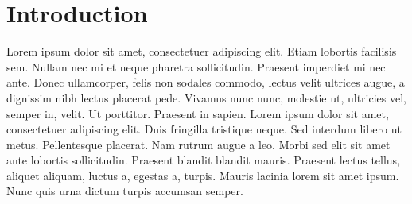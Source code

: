 \chapter{Introduction}
Lorem ipsum dolor sit amet, consectetuer adipiscing elit. Etiam lobortis facilisis
sem. Nullam nec mi et neque pharetra sollicitudin. Praesent imperdiet mi nec
ante. Donec ullamcorper, felis non sodales commodo, lectus velit ultrices augue,
a dignissim nibh lectus placerat pede. Vivamus nunc nunc, molestie ut, ultricies
vel, semper in, velit. Ut porttitor. Praesent in sapien. Lorem ipsum dolor sit
amet, consectetuer adipiscing elit. Duis fringilla tristique neque. Sed interdum
libero ut metus. Pellentesque placerat. Nam rutrum augue a leo. Morbi sed elit
sit amet ante lobortis sollicitudin. Praesent blandit blandit mauris. Praesent
lectus tellus, aliquet aliquam, luctus a, egestas a, turpis. Mauris lacinia lorem
sit amet ipsum. Nunc quis urna dictum turpis accumsan semper.